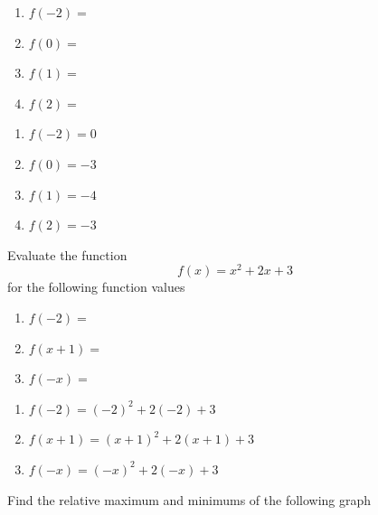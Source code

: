 \documentclass[addpoints,12pt]{exam}
\begin{document}
\begin{questions}
\begin{enumerate}[label = \alph*)j]
    \item $f(-2) =  $
		\item $f(0) = $
		\item $f(1) = $
		\item $f(2) = $
\end{enumerate}

\begin{solution}
\begin{enumerate}[label = \alph*)j]
    \item $f(-2) = 0$
		\item $f(0) = -3$
		\item $f(1) = -4$
		\item $f(2) = -3$
\end{enumerate}
\end{solution}

\question Evaluate the function
\[
f(x)=x^{2}+2x+3
\]
for the following function values 
\begin{enumerate}[label = \alph*)]
    \item $f(-2)=$ 
		\item $f(x+1)=$
		\item $f(-x)=$
\end{enumerate}

\begin{solution}
     \begin{enumerate} [label = \alph*)]
         \item $f(-2) = (-2)^{2} + 2(-2) +3 $
				 \item $f(x+1) = (x+1)^{2}+2(x+1)+3 $
				 \item $f(-x) = (-x)^{2}+2(-x)+3 $
     \end{enumerate}
\end{solution}

\question Find the relative maximum and minimums of the following graph 


\end{questions}
\end{document}
